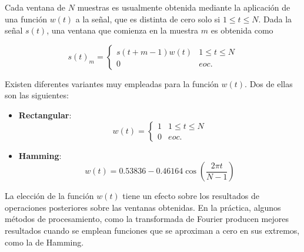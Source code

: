 Cada ventana de $N$ muestras es usualmente obtenida mediante la aplicación de una función $w(t)$ a la señal, que es distinta de cero solo si $1\leq t\leq N$.
Dada la señal $s(t)$, una ventana que comienza en la muestra $m$ es obtenida como

\begin{equation}
    \label{eq:windowing}
    s(t)_m = \begin{cases}
                 s(t + m-1)w(t) & 1\leq t\leq N \\
                 0 & eoc.
    \end{cases}
\end{equation}

Existen diferentes variantes muy empleadas para la función $w(t)$.
Dos de ellas son las siguientes:

\begin{itemize}
    \item \textbf{Rectangular}:
    \[
        w(t) = \begin{cases}
                   1 & 1\leq t\leq N \\
                   0 & eoc.
        \end{cases}
    \]
    \item \textbf{Hamming}:
    \[
        w(t) = 0.53836 - 0.46164 \cos\left(\frac{2\pi t}{N-1}\right)
    \]
\end{itemize}

La elección de la función $w(t)$ tiene un efecto sobre los resultados de operaciones posteriores sobre las ventanas obtenidas.
En la práctica, algunos métodos de procesamiento, como la transformada de Fourier producen mejores resultados cuando se emplean funciones que se aproximan a cero en sus extremos, como la de Hamming.
